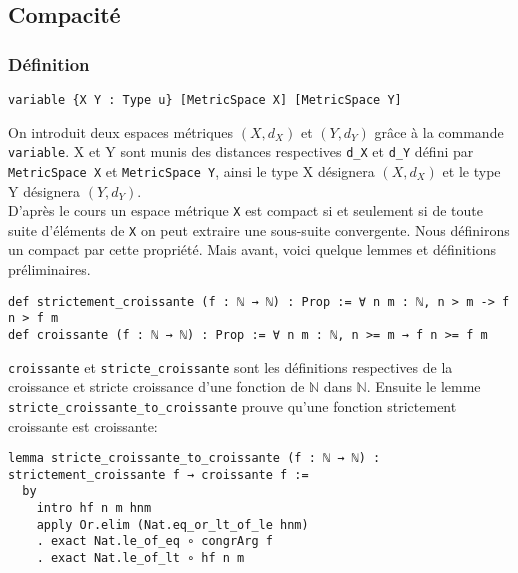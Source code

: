 \documentclass[a4paper, 12pt]{article}
\newcommand{\lean}[1]{\texttt{#1}}
\begin{document}
\subsection{Compacité}

\subsubsection{Définition}

\begin{verbatim}
variable {X Y : Type u} [MetricSpace X] [MetricSpace Y]
\end{verbatim}

On introduit deux espaces métriques $(X,d_{X})$ et $(Y,d_{Y})$ grâce à la commande \lean{variable}. X et Y sont munis des distances respectives \lean{d_{X}} et \lean{d_{Y}} défini par \lean{MetricSpace X} et \lean{MetricSpace Y}, ainsi le type X désignera $(X,d_{X})$ et le type Y désignera $(Y,d_{Y})$.\\

D'après le cours un espace métrique \lean{X} est compact si et seulement si de toute suite d'éléments de \lean{X} on peut extraire une sous-suite convergente. Nous définirons un compact par cette propriété. Mais avant, voici quelque lemmes et définitions préliminaires.

\begin{verbatim}
def strictement_croissante (f : ℕ → ℕ) : Prop := ∀ n m : ℕ, n > m -> f n > f m
def croissante (f : ℕ → ℕ) : Prop := ∀ n m : ℕ, n >= m → f n >= f m
\end{verbatim}

\lean{croissante} et \lean{stricte_croissante} sont les définitions respectives de la croissance et stricte croissance d'une fonction de $\mathbb{N}$ dans $\mathbb{N}$. Ensuite le lemme \lean{stricte_croissante_to_croissante} prouve qu'une fonction strictement croissante est croissante:

\begin{verbatim}
lemma stricte_croissante_to_croissante (f : ℕ → ℕ) : strictement_croissante f → croissante f :=
  by
    intro hf n m hnm
    apply Or.elim (Nat.eq_or_lt_of_le hnm)
    . exact Nat.le_of_eq ∘ congrArg f
    . exact Nat.le_of_lt ∘ hf n m
\end{verbatim}
\end{document}
